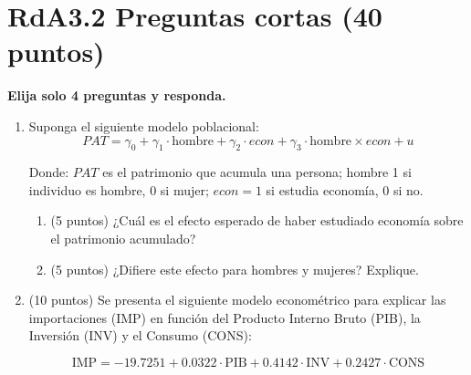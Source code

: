 \documentclass[10pt,a4paper]{article}
\begin{document}
\section{RdA3.2  Preguntas cortas (40 puntos)}
{\bf Elija solo 4 preguntas y responda. }
\begin{enumerate}

\item Suponga el siguiente modelo poblacional:
$$PAT = \gamma_0 + \gamma_1 \cdot \text{hombre} + \gamma_2 \cdot econ + \gamma_3 \cdot \text{hombre} \times econ +u$$

Donde: $PAT$ es el patrimonio que acumula una persona; hombre 1 si individuo es hombre, 0 si mujer; $econ = 1$ si estudia economía, 0 si no.
\begin{enumerate}
    \item[(a)] (5 puntos) ¿Cuál es el efecto esperado de haber estudiado economía sobre el patrimonio acumulado?
    \item[(b)] (5 puntos) ¿Difiere este efecto para
hombres y mujeres? Explique.
\end{enumerate}

\item (10 puntos) 
Se presenta el siguiente modelo econométrico para explicar las importaciones (IMP) en función del Producto Interno Bruto (PIB), la Inversión (INV) y el Consumo (CONS):

\[
\text{IMP} = -19.7251 + 0.0322 \cdot \text{PIB} + 0.4142 \cdot \text{INV} + 0.2427 \cdot \text{CONS}
\]


\end{enumerate}
\end{document}
